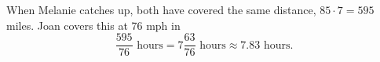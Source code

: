When Melanie catches up, both have covered the same distance, $85\cdot7=595$ miles. Joan covers this at $76$ mph in
\[
\dfrac{595}{76}\text{ hours}=\boxed{7\dfrac{63}{76}\text{ hours}}\approx7.83\text{ hours}.
\]
